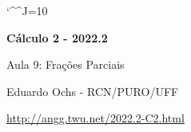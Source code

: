 \documentclass[oneside,12pt]{article}
\begin{document}
\catcode`\^^J=10
\pu
\def\pictgridstyle{\color{GrayPale}\linethickness{0.3pt}}
\def\pictaxesstyle{\linethickness{0.5pt}}
\def\pictnaxesstyle{\color{GrayPale}\linethickness{0.5pt}}
\celllower=2.5pt


\def\u#1{\par{\footnotesize \url{#1}}}

\def\drafturl{http://angg.twu.net/LATEX/2022-2-C2.pdf}
\def\drafturl{http://angg.twu.net/2022.2-C2.html}
\def\draftfooter{\tiny \href{\drafturl}{\jobname{}} \ColorBrown{\shorttoday{} \hours}}

\def\together   {\mathsf{together}}
\def\togetherp#1{\mathsf{together}\left(#1\right)}
\def\apart      {\mathsf{apart}}



%

\thispagestyle{empty}

\begin{center}

\vspace*{1.2cm}

{\bf \Large Cálculo 2 - 2022.2}

\bsk

Aula 9: Frações Parciais

\bsk

Eduardo Ochs - RCN/PURO/UFF

\url{http://angg.twu.net/2022.2-C2.html}

\end{center}

\newpage

%                         
\end{document}
